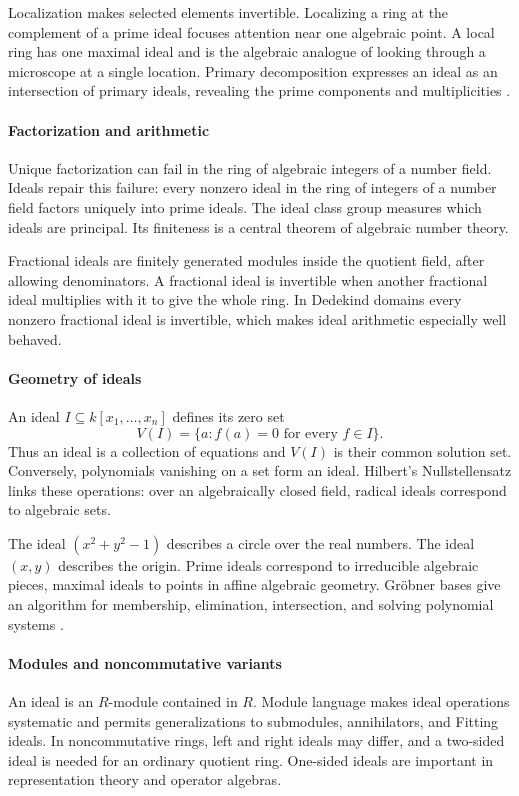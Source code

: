 Localization makes selected elements invertible. Localizing a ring at the complement of a prime ideal focuses attention near one algebraic point. A local ring has one maximal ideal and is the algebraic analogue of looking through a microscope at a single location. Primary decomposition expresses an ideal as an intersection of primary ideals, revealing the prime components and multiplicities \cite{ideal_theory_ref2}.

\paragraph{Factorization and arithmetic}
Unique factorization can fail in the ring of algebraic integers of a number field. Ideals repair this failure: every nonzero ideal in the ring of integers of a number field factors uniquely into prime ideals. The ideal class group measures which ideals are principal. Its finiteness is a central theorem of algebraic number theory.

Fractional ideals are finitely generated modules inside the quotient field, after allowing denominators. A fractional ideal is invertible when another fractional ideal multiplies with it to give the whole ring. In Dedekind domains every nonzero fractional ideal is invertible, which makes ideal arithmetic especially well behaved.

\paragraph{Geometry of ideals}
An ideal $I\subseteq k[x_1,\ldots,x_n]$ defines its zero set
\[
V(I)=\{a: f(a)=0\text{ for every }f\in I\}.
\]
Thus an ideal is a collection of equations and $V(I)$ is their common solution set. Conversely, polynomials vanishing on a set form an ideal. Hilbert's Nullstellensatz links these operations: over an algebraically closed field, radical ideals correspond to algebraic sets.

The ideal $(x^2+y^2-1)$ describes a circle over the real numbers. The ideal $(x,y)$ describes the origin. Prime ideals correspond to irreducible algebraic pieces, maximal ideals to points in affine algebraic geometry. Gröbner bases give an algorithm for membership, elimination, intersection, and solving polynomial systems \cite{ideal_theory_ref3}.

\paragraph{Modules and noncommutative variants}
An ideal is an $R$-module contained in $R$. Module language makes ideal operations systematic and permits generalizations to submodules, annihilators, and Fitting ideals. In noncommutative rings, left and right ideals may differ, and a two-sided ideal is needed for an ordinary quotient ring. One-sided ideals are important in representation theory and operator algebras.

